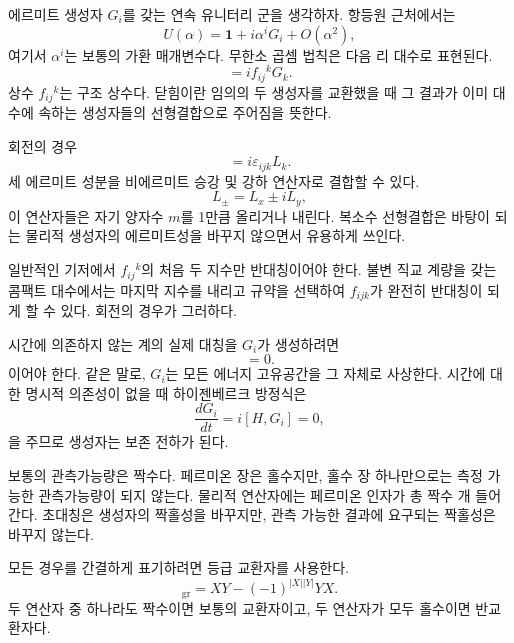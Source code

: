 에르미트 생성자 \(G_i\)를 갖는 연속 유니터리 군을 생각하자. 항등원 근처에서는
\begin{equation}
U(\alpha)=\mathbf 1+i\alpha^iG_i+O(\alpha^2),
\end{equation}
여기서 \(\alpha^i\)는 보통의 가환 매개변수다. 무한소 곱셈 법칙은 다음 리 대수로 표현된다.
\begin{equation}
[G_i,G_j]=i f_{ij}{}^{k}G_k.
\end{equation}
상수 \(f_{ij}{}^k\)는 구조 상수다. 닫힘이란 임의의 두 생성자를 교환했을 때 그 결과가 이미 대수에 속하는 생성자들의 선형결합으로 주어짐을 뜻한다.

회전의 경우
\begin{equation}
[L_i,L_j]=i\varepsilon_{ijk}L_k.
\end{equation}
세 에르미트 성분을 비에르미트 승강 및 강하 연산자로 결합할 수 있다.
\begin{equation}
L_\pm=L_x\pm iL_y,
\end{equation}
이 연산자들은 자기 양자수 \(m\)를 1만큼 올리거나 내린다. 복소수 선형결합은 바탕이 되는 물리적 생성자의 에르미트성을 바꾸지 않으면서 유용하게 쓰인다.

일반적인 기저에서 \(f_{ij}{}^k\)의 처음 두 지수만 반대칭이어야 한다. 불변 직교 계량을 갖는 콤팩트 대수에서는 마지막 지수를 내리고 규약을 선택하여 \(f_{ijk}\)가 완전히 반대칭이 되게 할 수 있다. 회전의 경우가 그러하다. 

시간에 의존하지 않는 계의 실제 대칭을 \(G_i\)가 생성하려면
\begin{equation}
[H,G_i]=0.
\end{equation}
이어야 한다. 같은 말로, \(G_i\)는 모든 에너지 고유공간을 그 자체로 사상한다. 시간에 대한 명시적 의존성이 없을 때 하이젠베르크 방정식은
\begin{equation}
\frac{dG_i}{dt}=i[H,G_i]=0,
\end{equation}
을 주므로 생성자는 보존 전하가 된다.

보통의 관측가능량은 짝수다. 페르미온 장은 홀수지만, 홀수 장 하나만으로는 측정 가능한 관측가능량이 되지 않는다. 물리적 연산자에는 페르미온 인자가 총 짝수 개 들어간다. 초대칭은 생성자의 짝홀성을 바꾸지만, 관측 가능한 결과에 요구되는 짝홀성은 바꾸지 않는다.

모든 경우를 간결하게 표기하려면 등급 교환자를 사용한다.
\begin{equation}
[X,Y]_{\mathrm{gr}}
=XY-(-1)^{|X||Y|}YX.
\end{equation}
두 연산자 중 하나라도 짝수이면 보통의 교환자이고, 두 연산자가 모두 홀수이면 반교환자다.


